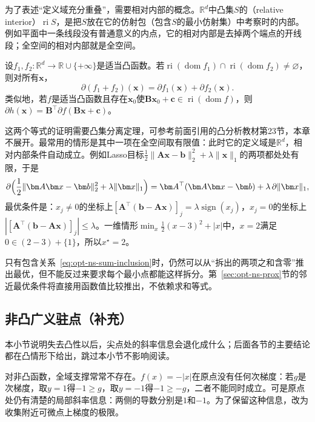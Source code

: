 为了表述“定义域充分重叠”，需要相对内部的概念。$\mathbb R^d$中凸集$S$的（relative interior）$\operatorname{ri}S$，是把$S$放在它的仿射包（包含$S$的最小仿射集）中考察时的内部。例如平面中一条线段没有普通意义的内点，它的相对内部是去掉两个端点的开线段；全空间的相对内部就是全空间。

\begin{theorem}[次微分的求和与复合规则]
\label{thm:opt-ns-sum-rule}
设$f_1,f_2:\mathbb R^d\to\mathbb R\cup\{+\infty\}$是适当凸函数。若$\operatorname{ri}(\operatorname{dom}f_1)\cap\operatorname{ri}(\operatorname{dom}f_2)\neq\varnothing$，则对所有$\bm x$，
\[
 \partial(f_1+f_2)(\bm x)=\partial f_1(\bm x)+\partial f_2(\bm x).
\]
类似地，若$f$是适当凸函数且存在$\bm x_0$使$\bm B\bm x_0+\bm c\in\operatorname{ri}(\operatorname{dom}f)$，则$\partial h(\bm x)=\bm B^\top\partial f(\bm B\bm x+\bm c)$。
\end{theorem}

这两个等式的证明需要凸集分离定理，可参考前面引用的凸分析教材第23节，本章不展开。最常用的情形是其中一项在全空间取有限值：此时它的定义域是$\mathbb R^d$，相对内部条件自动成立。例如Lasso目标$\frac12\lVert\bm A\bm x-\bm b\rVert_2^2+\lambda\lVert\bm x\rVert_1$的两项都处处有限，于是
\[
 \partial\Bigl(\frac12\lVert\bm A\bm x-\bm b\rVert_2^2+\lambda\lVert\bm x\rVert_1\Bigr)
 =\bm A^\top(\bm A\bm x-\bm b)+\lambda\,\partial\lVert\bm x\rVert_1,
\]
最优条件是：$x_j\neq0$的坐标上$[\bm A^\top(\bm b-\bm A\bm x)]_j=\lambda\operatorname{sign}(x_j)$，$x_j=0$的坐标上$|[\bm A^\top(\bm b-\bm A\bm x)]_j|\leq\lambda$。一维情形$\min_x\frac12(x-3)^2+|x|$中，$x=2$满足$0\in(2-3)+\{1\}$，所以$x^\star=2$。

只有包含关系~\eqref{eq:opt-ns-sum-inclusion}时，仍然可以从“拆出的两项之和含零”推出最优，但不能反过来要求每个最小点都能这样拆分。第~\ref{sec:opt-ns-prox}节的邻近最优条件将直接用函数值比较推出，不依赖求和等式。

\subsection{非凸广义驻点（补充）}
\label{sec:opt-ns-clarke}

本小节说明失去凸性以后，尖点处的斜率信息会退化成什么；后面各节的主要结论都在凸情形下给出，跳过本小节不影响阅读。

对非凸函数，全域支撑常常不存在。$f(x)=-|x|$在原点没有任何次梯度：若$g$是次梯度，取$y=1$得$-1\geq g$，取$y=-1$得$-1\geq-g$，二者不能同时成立。可是原点处仍有清楚的局部斜率信息：两侧的导数分别是$1$和$-1$。为了保留这种信息，改为收集附近可微点上梯度的极限。

